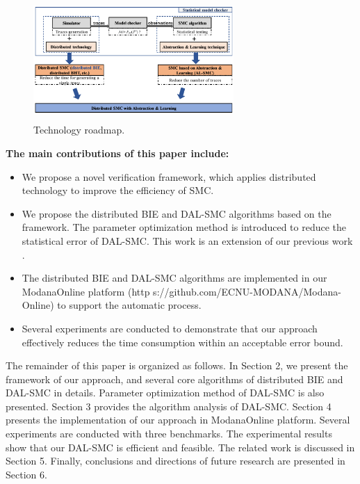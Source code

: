 \begin{figure}[htbp]
	{
	\centering	
	\includegraphics[width=3.0in,height=1.8in]{fig/paper-framework.png}
\caption{Technology roadmap.}\label{tech-map}	
	}
	
\end{figure}

\textbf{The main contributions of this paper include:} 
\begin{itemize}
\item
We propose a novel verification framework, which applies distributed technology to improve the efficiency of SMC.
\item
We propose the distributed BIE and DAL-SMC algorithms based on the framework. The parameter optimization method is introduced to reduce the statistical error of DAL-SMC. This work is an extension of our previous work \cite{jiangkaiqiang2016}.
\item
The distributed BIE and DAL-SMC algorithms are implemented in our ModanaOnline platform  \cite{Cheng2015Modana} (http
s://github.com/ECNU-MODANA/Modana-Online) to support the automatic process. 
\item
Several experiments are conducted to demonstrate that our approach effectively reduces the time consumption within an acceptable error bound.
\end{itemize}

The remainder of this paper is organized as follows. In Section 2, we present the framework of our approach, and several core algorithms of distributed BIE and DAL-SMC in details. Parameter optimization method of DAL-SMC is also presented. Section 3 provides the algorithm analysis of DAL-SMC. Section 4 presents the implementation of our approach in ModanaOnline platform. Several experiments are conducted with three benchmarks. The experimental results show that our DAL-SMC is efficient and feasible. The related work is discussed in Section 5. Finally, conclusions and directions of future research are presented in Section 6. 